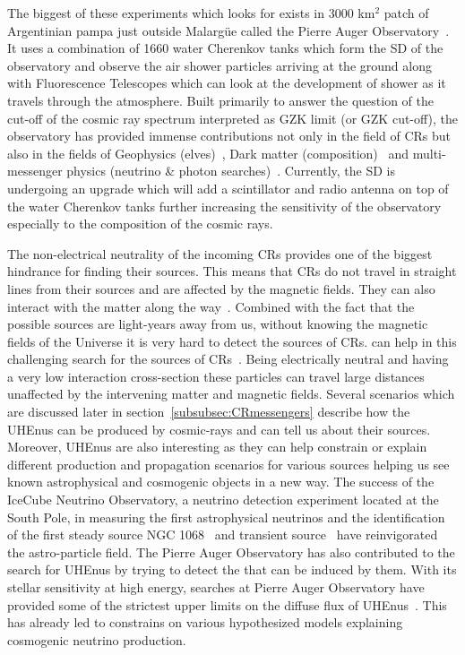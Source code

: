 The biggest of these experiments which looks for  exists in 3000 km$^2$ patch of Argentinian pampa just outside Malargüe called the Pierre Auger Observatory~\cite{Auger:2015}. It uses a combination of 1660 water Cherenkov tanks which form the \gls{SD} of the observatory and observe the air shower particles arriving at the ground along with Fluorescence Telescopes which can look at the development of shower as it travels through the atmosphere. Built primarily to answer the question of the cut-off of the cosmic ray spectrum interpreted as \gls{GZK} limit (or GZK cut-off), the observatory has provided immense contributions not only in the field of \glspl{CR} but also in the fields of Geophysics (elves)~\cite{Mussa_2022}, Dark matter (composition)~\cite{Abreu_2023} and multi-messenger physics (neutrino \& photon searches)~\cite{Aab_2019_point,Auger_photons_2022}. Currently, the \gls{SD} is undergoing an upgrade which will add a scintillator and radio antenna on top of the water Cherenkov tanks further increasing the sensitivity of the observatory especially to the composition of the cosmic rays.

The non-electrical neutrality of the incoming \glspl{CR} provides one of the biggest hindrance for finding their sources. This means that \glspl{CR} do not travel in straight lines from their sources and are affected by the magnetic fields. They can also interact with the matter along the way~\cite{bister2024largescaleanisotropyfluxdemagnification, ALLARD201233}. Combined with the fact that the possible sources are light-years away from us, without knowing the magnetic fields of the Universe it is very hard to detect the sources of \glspl{CR}.  can help in this challenging search for the sources of \glspl{CR}~\cite{UHEcorrelation_2016}. Being electrically neutral and having a very low interaction cross-section these particles can travel large distances unaffected by the intervening matter and magnetic fields. Several scenarios which are discussed later in section~\ref{subsubsec:CRmessengers} describe how the \glspl{UHEnu} can be produced by cosmic-rays and can tell us about their sources. Moreover, \glspl{UHEnu} are also interesting as they can help constrain or explain different production and propagation scenarios for various sources helping us see known astrophysical and cosmogenic objects in a new way. The success of the IceCube Neutrino Observatory, a neutrino detection experiment located at the South Pole, in measuring the first astrophysical neutrinos and the identification of the first steady source NGC 1068~\cite{Icecube_2022} and transient source~\cite{Icecube_txs} have reinvigorated the astro-particle field. The Pierre Auger Observatory has also contributed to the search for \glspl{UHEnu} by trying to detect the  that can be induced by them. With its stellar sensitivity at high energy, searches at Pierre Auger Observatory have provided some of the strictest upper limits on the diffuse flux of \glspl{UHEnu}~\cite{Aab_2019_diffuse}. This has already led to constrains on various hypothesized models explaining cosmogenic neutrino production.

